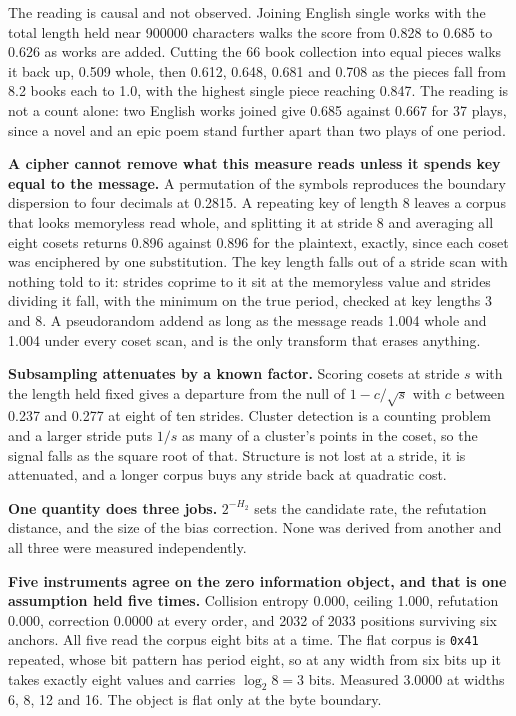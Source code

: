 The reading is causal and not observed. Joining English single works with the total length held near 900000 characters walks the score from 0.828 to 0.685 to 0.626 as works are added. Cutting the 66 book collection into equal pieces walks it back up, 0.509 whole, then 0.612, 0.648, 0.681 and 0.708 as the pieces fall from 8.2 books each to 1.0, with the highest single piece reaching 0.847. The reading is not a count alone: two English works joined give 0.685 against 0.667 for 37 plays, since a novel and an epic poem stand further apart than two plays of one period.

\textbf{A cipher cannot remove what this measure reads unless it spends key equal to the message.} A permutation of the symbols reproduces the boundary dispersion to four decimals at 0.2815. A repeating key of length 8 leaves a corpus that looks memoryless read whole, and splitting it at stride 8 and averaging all eight cosets returns 0.896 against 0.896 for the plaintext, exactly, since each coset was enciphered by one substitution. The key length falls out of a stride scan with nothing told to it: strides coprime to it sit at the memoryless value and strides dividing it fall, with the minimum on the true period, checked at key lengths 3 and 8. A pseudorandom addend as long as the message reads 1.004 whole and 1.004 under every coset scan, and is the only transform that erases anything.

\textbf{Subsampling attenuates by a known factor.} Scoring cosets at stride \(s\) with the length held fixed gives a departure from the null of \(1 - c/\sqrt{s}\) with \(c\) between 0.237 and 0.277 at eight of ten strides. Cluster detection is a counting problem and a larger stride puts \(1/s\) as many of a cluster's points in the coset, so the signal falls as the square root of that. Structure is not lost at a stride, it is attenuated, and a longer corpus buys any stride back at quadratic cost.

\textbf{One quantity does three jobs.} \(2^{-H_2}\) sets the candidate rate, the refutation distance, and the size of the bias correction. None was derived from another and all three were measured independently.

\textbf{Five instruments agree on the zero information object, and that is one assumption held five times.} Collision entropy 0.000, ceiling 1.000, refutation 0.000, correction 0.0000 at every order, and 2032 of 2033 positions surviving six anchors. All five read the corpus eight bits at a time. The flat corpus is \texttt{0x41} repeated, whose bit pattern has period eight, so at any width from six bits up it takes exactly eight values and carries \(\log_2 8 = 3\) bits. Measured 3.0000 at widths 6, 8, 12 and 16. The object is flat only at the byte boundary.

